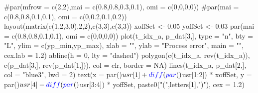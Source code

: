 \documentclass[11pt,]{article}
\newenvironment{Shaded}{}{}
\newcommand{\KeywordTok}[1]{\textcolor[rgb]{0.00,0.00,1.00}{#1}}
\newcommand{\DataTypeTok}[1]{#1}
\newcommand{\DecValTok}[1]{#1}
\newcommand{\FloatTok}[1]{#1}
\newcommand{\StringTok}[1]{\textcolor[rgb]{0.00,0.50,0.50}{#1}}
\newcommand{\CommentTok}[1]{\textcolor[rgb]{0.00,0.50,0.00}{#1}}
\newcommand{\OtherTok}[1]{\textcolor[rgb]{1.00,0.25,0.00}{#1}}
\newcommand{\OperatorTok}[1]{#1}
\newcommand{\NormalTok}[1]{#1}
\begin{document}
\begin{Shaded}
\begin{Highlighting}[]
\CommentTok{#par(mfrow = c(2,2),mai = c(0.8,0.8,0.3,0.1), omi = c(0,0,0,0))}
\CommentTok{#par(mai = c(0.8,0.8,0.1,0.1), omi = c(0,0.2,0.1,0.2))}
\KeywordTok{layout}\NormalTok{(}\KeywordTok{matrix}\NormalTok{(}\KeywordTok{c}\NormalTok{(}\DecValTok{1}\NormalTok{,}\DecValTok{2}\NormalTok{,}\DecValTok{3}\NormalTok{,}\DecValTok{0}\NormalTok{),}\DecValTok{2}\NormalTok{,}\DecValTok{2}\NormalTok{),}\KeywordTok{c}\NormalTok{(}\DecValTok{3}\NormalTok{,}\DecValTok{3}\NormalTok{),}\KeywordTok{c}\NormalTok{(}\DecValTok{3}\NormalTok{,}\DecValTok{3}\NormalTok{))}
\NormalTok{xoffSet <-}\StringTok{ }\FloatTok{0.05}
\NormalTok{yoffSet <-}\StringTok{ }\FloatTok{0.03}
\KeywordTok{par}\NormalTok{(}\DataTypeTok{mai =} \KeywordTok{c}\NormalTok{(}\FloatTok{0.8}\NormalTok{,}\FloatTok{0.8}\NormalTok{,}\FloatTok{0.1}\NormalTok{,}\FloatTok{0.1}\NormalTok{), }\DataTypeTok{omi =} \KeywordTok{c}\NormalTok{(}\DecValTok{0}\NormalTok{,}\DecValTok{0}\NormalTok{,}\DecValTok{0}\NormalTok{,}\DecValTok{0}\NormalTok{))}
\KeywordTok{plot}\NormalTok{(t_idx_a, p_dat[}\DecValTok{3}\NormalTok{,],}
     \DataTypeTok{type =} \StringTok{"n"}\NormalTok{,  }\DataTypeTok{bty =} \StringTok{"L"}\NormalTok{,}
     \DataTypeTok{ylim =} \KeywordTok{c}\NormalTok{(yp_min,yp_max),}
     \DataTypeTok{xlab =} \StringTok{""}\NormalTok{, }\DataTypeTok{ylab =} \StringTok{"Process error"}\NormalTok{, }\DataTypeTok{main =} \StringTok{""}\NormalTok{,}
     \DataTypeTok{cex.lab =} \FloatTok{1.2}\NormalTok{)}
\KeywordTok{abline}\NormalTok{(}\DataTypeTok{h =} \DecValTok{0}\NormalTok{, }\DataTypeTok{lty =} \StringTok{"dashed"}\NormalTok{)}
\KeywordTok{polygon}\NormalTok{(}\KeywordTok{c}\NormalTok{(t_idx_a, }\KeywordTok{rev}\NormalTok{(t_idx_a)), }\KeywordTok{c}\NormalTok{(p_dat[}\DecValTok{3}\NormalTok{,], }\KeywordTok{rev}\NormalTok{(p_dat[}\DecValTok{1}\NormalTok{,])),}
        \DataTypeTok{col =}\NormalTok{ clr, }\DataTypeTok{border =} \OtherTok{NA}\NormalTok{)}
\KeywordTok{lines}\NormalTok{(t_idx_a, p_dat[}\DecValTok{2}\NormalTok{,], }\DataTypeTok{col =} \StringTok{"blue3"}\NormalTok{, }\DataTypeTok{lwd =} \DecValTok{2}\NormalTok{)}
\KeywordTok{text}\NormalTok{(}\DataTypeTok{x =} \KeywordTok{par}\NormalTok{()}\OperatorTok{$}\NormalTok{usr[}\DecValTok{1}\NormalTok{] }\OperatorTok{+}\StringTok{ }\KeywordTok{diff}\NormalTok{(}\KeywordTok{par}\NormalTok{()}\OperatorTok{$}\NormalTok{usr[}\DecValTok{1}\OperatorTok{:}\DecValTok{2}\NormalTok{]) }\OperatorTok{*}\StringTok{ }\NormalTok{xoffSet,}
\DataTypeTok{y =} \KeywordTok{par}\NormalTok{()}\OperatorTok{$}\NormalTok{usr[}\DecValTok{4}\NormalTok{] }\OperatorTok{-}\StringTok{ }\KeywordTok{diff}\NormalTok{(}\KeywordTok{par}\NormalTok{()}\OperatorTok{$}\NormalTok{usr[}\DecValTok{3}\OperatorTok{:}\DecValTok{4}\NormalTok{]) }\OperatorTok{*}\StringTok{ }\NormalTok{yoffSet,}
\KeywordTok{paste0}\NormalTok{(}\StringTok{"("}\NormalTok{,letters[}\DecValTok{1}\NormalTok{],}\StringTok{")"}\NormalTok{),}
\DataTypeTok{cex =} \FloatTok{1.2}\NormalTok{)}


\end{Highlighting}
\end{Shaded}
\end{document}

